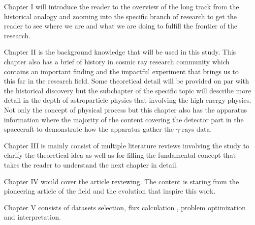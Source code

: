 Chapter I will introduce the reader to the overview of the long 
track from the historical analogy and zooming into the specific 
branch of research to get the reader to see where we are and what 
we are doing to fulfill the frontier of the research.

Chapter II is the background knowledge that will be used in this 
study. This chapter also has a brief of history in cosmic ray 
research community which contains an important finding and the 
impactful experiment that brings us to this far in the research field.
Some theoretical detail will be provided on par with the historical
discovery but the subchapter of the specific topic will describe more
detail in the depth of astroparticle physics that involving the high 
energy physics. Not only the concept of physical process but this 
chapter also has the apparatus information where the majority of the
content covering the detector part in the spacecraft to demonstrate
how the apparatus gather the $\gamma$-rays data.

Chapter III is mainly consist of multiple literature reviews involving
the study to clarify the theoretical idea as well as for filling the
fundamental concept that takes the reader to understand the next chapter 
in detail. 


Chapter IV would cover the article reviewing.
The content is staring from the pioneering article of the 
field and the evolution that inspire this work.

Chapter V consists of datasets selection, flux calculation
, problem optimization and interpretation.


